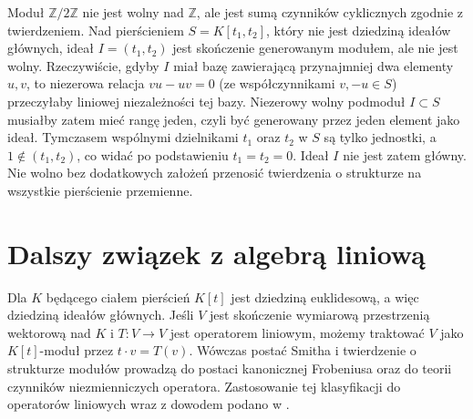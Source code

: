 \begin{przyklad}
Moduł $\mathbb Z/2\mathbb Z$ nie jest wolny nad $\mathbb Z$,
ale jest sumą czynników cyklicznych zgodnie z twierdzeniem.
Nad pierścieniem $S=K[t_1,t_2]$, który nie jest dziedziną
ideałów głównych, ideał $I=(t_1,t_2)$ jest skończenie generowanym
modułem, ale nie jest wolny. Rzeczywiście, gdyby $I$ miał bazę zawierającą
przynajmniej dwa elementy $u,v$, to niezerowa relacja
$vu-uv=0$ (ze współczynnikami $v,-u\in S$)
przeczyłaby liniowej niezależności tej bazy.
Niezerowy wolny podmoduł $I\subset S$ musiałby zatem
mieć rangę jeden, czyli być generowany przez
jeden element jako ideał. Tymczasem wspólnymi dzielnikami
$t_1$ oraz $t_2$ w $S$ są tylko jednostki, a
$1\notin(t_1,t_2)$, co widać po podstawieniu
$t_1=t_2=0$. Ideał $I$ nie jest zatem główny.
Nie wolno bez dodatkowych założeń przenosić twierdzenia
o strukturze na wszystkie pierścienie przemienne.
\end{przyklad}

\section{Dalszy związek z algebrą liniową}
Dla $K$ będącego ciałem pierścień $K[t]$ jest dziedziną
euklidesową, a więc dziedziną ideałów głównych. Jeśli
$V$ jest skończenie wymiarową przestrzenią wektorową nad $K$
i $T:V\to V$ jest operatorem liniowym, możemy traktować $V$
jako $K[t]$-moduł przez $t\cdot v=T(v)$.
Wówczas postać Smitha i twierdzenie o strukturze modułów
prowadzą do postaci kanonicznej Frobeniusa oraz do teorii
czynników niezmienniczych operatora. Zastosowanie tej klasyfikacji do operatorów liniowych wraz z dowodem
podano w .
